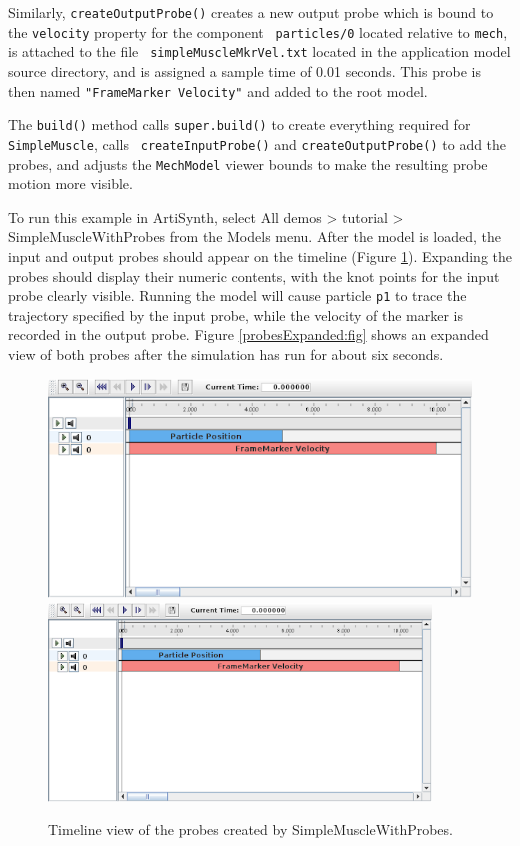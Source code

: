 Similarly, {\tt createOutputProbe()} creates a new output probe which
is bound to the {\tt velocity} property for the component {\tt
particles/0} located relative to {\tt mech}, is attached to the file {\tt
simpleMuscleMkrVel.txt} located in the application model source
directory, and is assigned a sample time of 0.01 seconds. This probe is
then named {\tt "FrameMarker Velocity"} and added to the root model.

The {\tt build()} method calls {\tt super.build()} to create
everything required for {\tt SimpleMuscle}, calls {\tt
createInputProbe()} and {\tt createOutputProbe()} to add the probes,
and adjusts the {\tt MechModel} viewer bounds to make the resulting
probe motion more visible.

To run this example in ArtiSynth, select {\sf All demos > tutorial >
SimpleMuscleWithProbes} from the {\sf Models} menu. After the model is
loaded, the input and output probes should appear on the timeline
(Figure \ref{probes:fig}). Expanding the probes should display their
numeric contents, with the knot points for the input probe clearly
visible.  Running the model will cause particle {\tt p1} to trace the
trajectory specified by the input probe, while the velocity of the
marker is recorded in the output probe. Figure
\ref{probesExpanded:fig} shows an expanded view of both probes after
the simulation has run for about six seconds.


\begin{figure}[ht]
\begin{center}
\iflatexml
 \includegraphics[]{images/timelineProbes}
\else
 \includegraphics[width=4in]{images/timelineProbes}
\fi
\end{center}
\caption{Timeline view of the probes created by SimpleMuscleWithProbes.}
\label{probes:fig}
\end{figure}


